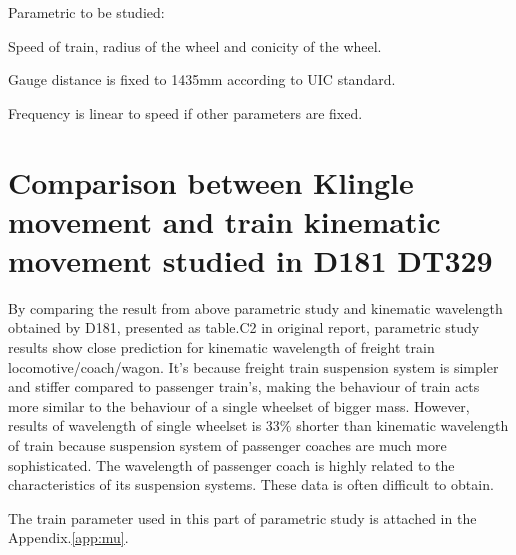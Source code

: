 Parametric to be studied:

Speed of train, radius of the wheel and conicity of the wheel. 

Gauge distance is fixed to 1435mm according to UIC standard. 

Frequency is linear to speed if other parameters are fixed.

\section{Comparison between Klingle movement and train kinematic movement studied in D181 DT329}

By comparing the result from above parametric study and kinematic wavelength obtained by D181, presented as table.C2 in original report, parametric study results show close prediction for kinematic wavelength of freight train locomotive/coach/wagon. It's because freight train suspension system is simpler and stiffer compared to passenger train's, making the behaviour of train acts more similar to the behaviour of a single wheelset of bigger mass. However, results of  wavelength of single wheelset is 33\% shorter than kinematic wavelength of train because suspension system of passenger coaches are much more sophisticated. The wavelength of passenger coach is highly related to the characteristics of its suspension systems. These data is often difficult to obtain. 



The train parameter used in this part of parametric study is attached in the Appendix.\ref{app:mu}. 

